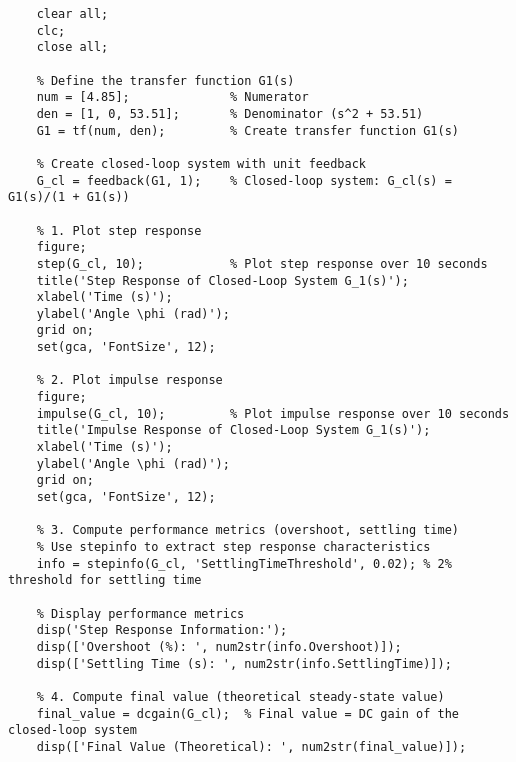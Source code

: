     \begin{lstlisting}[caption={Code vẽ đáp ứng hệ thống chưa điều khiển}, label={lst:step}]
    % Clear variables and previous plots
    clear all;
    clc;
    close all;
    
    % Define the transfer function G1(s)
    num = [4.85];              % Numerator
    den = [1, 0, 53.51];       % Denominator (s^2 + 53.51)
    G1 = tf(num, den);         % Create transfer function G1(s)
    
    % Create closed-loop system with unit feedback
    G_cl = feedback(G1, 1);    % Closed-loop system: G_cl(s) = G1(s)/(1 + G1(s))
    
    % 1. Plot step response
    figure;
    step(G_cl, 10);            % Plot step response over 10 seconds
    title('Step Response of Closed-Loop System G_1(s)');
    xlabel('Time (s)');
    ylabel('Angle \phi (rad)');
    grid on;
    set(gca, 'FontSize', 12);
    
    % 2. Plot impulse response
    figure;
    impulse(G_cl, 10);         % Plot impulse response over 10 seconds
    title('Impulse Response of Closed-Loop System G_1(s)');
    xlabel('Time (s)');
    ylabel('Angle \phi (rad)');
    grid on;
    set(gca, 'FontSize', 12);
    
    % 3. Compute performance metrics (overshoot, settling time)
    % Use stepinfo to extract step response characteristics
    info = stepinfo(G_cl, 'SettlingTimeThreshold', 0.02); % 2% threshold for settling time
    
    % Display performance metrics
    disp('Step Response Information:');
    disp(['Overshoot (%): ', num2str(info.Overshoot)]);
    disp(['Settling Time (s): ', num2str(info.SettlingTime)]);
    
    % 4. Compute final value (theoretical steady-state value)
    final_value = dcgain(G_cl);  % Final value = DC gain of the closed-loop system
    disp(['Final Value (Theoretical): ', num2str(final_value)]);
    \end{lstlisting}



    
